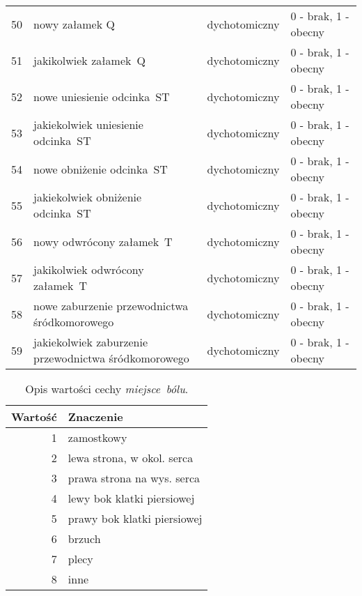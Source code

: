 \begin{longtabu}{rX[l]ll}
    \cmidrule(r){2-4}
    50            & nowy załamek Q                                        & dychotomiczny        & 0 - brak, 1 - obecny      \\
    51            & jakikolwiek załamek~Q                                 & dychotomiczny        & 0 - brak, 1 - obecny      \\
    52            & nowe uniesienie odcinka~ST                            & dychotomiczny        & 0 - brak, 1 - obecny      \\
    53            & jakiekolwiek uniesienie odcinka~ST                    & dychotomiczny        & 0 - brak, 1 - obecny      \\
    54            & nowe obniżenie odcinka~ST                             & dychotomiczny        & 0 - brak, 1 - obecny      \\
    55            & jakiekolwiek obniżenie odcinka~ST                     & dychotomiczny        & 0 - brak, 1 - obecny      \\
    56            & nowy odwrócony załamek~T                              & dychotomiczny        & 0 - brak, 1 - obecny      \\
    57            & jakikolwiek odwrócony załamek~T                       & dychotomiczny        & 0 - brak, 1 - obecny      \\
    58            & nowe zaburzenie przewodnictwa śródkomorowego          & dychotomiczny        & 0 - brak, 1 - obecny      \\
    59            & jakiekolwiek zaburzenie przewodnictwa śródkomorowego  & dychotomiczny        & 0 - brak, 1 - obecny      \\
    \bottomrule
\end{longtabu}

\begin{table}[H]
    \caption{Opis wartości cechy \textit{miejsce~bólu}.}\label{tab:cecha_3}
    \begin{tabu}{rX[l]}
        \toprule
        \textbf{Wartość} & \textbf{Znaczenie}          \\
        \midrule

        1                & zamostkowy                  \\
        2                & lewa strona, w okol. serca  \\
        3                & prawa strona na wys. serca  \\
        4                & lewy bok klatki piersiowej  \\
        5                & prawy bok klatki piersiowej \\
        6                & brzuch                      \\
        7                & plecy                       \\
        8                & inne                        \\
        \bottomrule
    \end{tabu}
\end{table}

